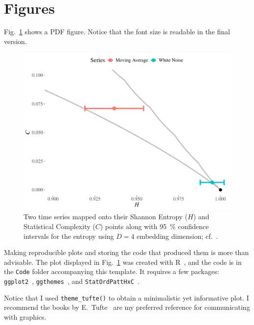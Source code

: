 \documentclass[conference,a4paper]{IEEEtran}
\begin{document}
\section{Figures}

Fig.~\ref{fig:Densities} shows a PDF figure.
Notice that the font size is readable in the final version.

\begin{figure}[hbt]
	\centering
	\includegraphics[width=\linewidth]{SinglePlot}
	\caption{Two time series mapped onto their Shannon Entropy ($H$) and Statistical Complexity ($C$) points along with \SI{95}{\percent} confidence intervals for the entropy using $D=4$ embedding dimension; cf.\ \citet{AsymptoticDistributionofEntropiesandFisherInformationMeasureofOrdinalPatternswithApplicationsa}.}\label{fig:Densities}
\end{figure}

Making reproducible plots and storing the code that produced them is more than advisable.
The plot displayed in Fig.~\ref{fig:Densities} was created with R~\cite{AmazingR}, and the code is in the \verb|Code| folder accompanying this template.
It requires a few packages: \verb|ggplot2|~\citep{ggplot2}, \verb|ggthemes|~\citep{ggthemes}, and
\verb|StatOrdPattHxC|~\citep{AsymptoticDistributionofEntropiesandFisherInformationMeasureofOrdinalPatternswithApplicationsa}.

Notice that I used \verb|theme_tufte()| to obtain a minimalistic yet informative plot.
I recommend the books by E.\ Tufte~\citep{Tufte01,VisualExplanationsImagesandQuantitiesEvidenceandNarrative,EnvisioningInformation,BeautifulEvidence} are my preferred reference for communicating with graphics.
\end{document}
